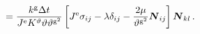 \documentclass[10pt,letterpaper,oneside]{report}
\newcommand{\ten}[1]{\mbox{\boldmath $#1$}{}}
\newcommand{\tenf}[1]{\mbox{{\sffamily{\bfseries {#1}}}}}
\newcommand{\scas}[1]{\mbox{{\scriptsize{${\rm{#1}}$}}}{}}
\begin{document}
\begin{align}
={}& \frac{k^{\scas{g}} \Delta t}{J^{\scas{e}} K^\vartheta \vartheta \vartheta^{\scas{g}^2} } \left[ J^{\scas{e}} \sigma_{ij} - \lambda \delta_{ij} 
- \frac{2 \mu }{\vartheta^{\scas{g}^2}} \ten{N}_{ij} \right]
\ten{N}_{kl} \, . 
\label{growth_tangent_fiber}
\end{align}
\end{document}
